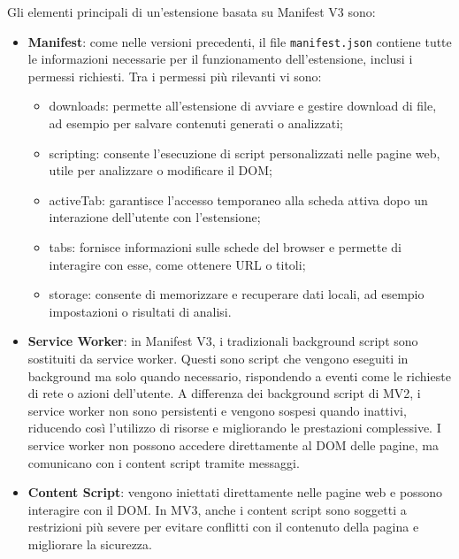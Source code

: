 Gli elementi principali di un’estensione basata su Manifest V3 sono:
\begin{itemize}
    \item \textbf{Manifest}: come nelle versioni precedenti, il file \texttt{manifest.json} contiene tutte le informazioni necessarie per il funzionamento dell’estensione, inclusi i permessi richiesti. 
    Tra i permessi più rilevanti vi sono: \begin{itemize}
        \item downloads: permette all’estensione di avviare e gestire download di file, ad esempio per salvare contenuti generati o analizzati;
        \item scripting: consente l’esecuzione di script personalizzati nelle pagine web, utile per analizzare o modificare il DOM;
        \item activeTab: garantisce l’accesso temporaneo alla scheda attiva dopo un interazione dell’utente con l’estensione;
        \item tabs: fornisce informazioni sulle schede del browser e permette di interagire con esse, come ottenere URL o titoli;
        \item storage: consente di memorizzare e recuperare dati locali, ad esempio impostazioni o risultati di analisi.
    \end{itemize}
    \item \textbf{Service Worker}: in Manifest V3, i tradizionali background script sono sostituiti da service worker. Questi sono script che vengono eseguiti in background ma solo quando necessario, rispondendo a eventi come le richieste di rete o azioni dell’utente. A differenza dei background script di MV2, i service worker non sono persistenti e vengono sospesi quando inattivi, riducendo così l’utilizzo di risorse e migliorando le prestazioni complessive. I service worker non possono accedere direttamente al DOM delle pagine, ma comunicano con i content script tramite messaggi.
    \item \textbf{Content Script}: vengono iniettati direttamente nelle pagine web e possono interagire con il DOM. In MV3, anche i content script sono soggetti a restrizioni più severe per evitare conflitti con il contenuto della pagina e migliorare la sicurezza.
\end{itemize}




